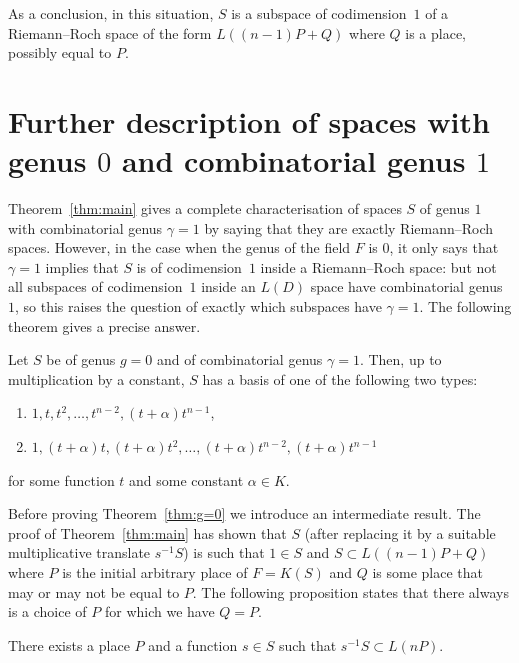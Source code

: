 \documentclass[ALCO,Unicode,ThmDefs]{cedram}
\begin{document}
As a conclusion, in this situation, $S$ is a subspace of codimension~$1$ of a Riemann--Roch space of the form $L((n-1)P+Q)$ where $Q$ is a place, possibly equal to $P$.


\section{Further description of spaces with genus \texorpdfstring{$0$}{0} and combinatorial genus \texorpdfstring{$1$}{1}}\label{sec:genus0}

Theorem~\ref{thm:main} gives a complete characterisation of spaces $S$ of genus $1$ with combinatorial genus $\gamma=1$ by saying that they are exactly Riemann--Roch spaces. However, in the case when the genus of the field $F$ is $0$, it only says that $\gamma=1$ implies that $S$ is of codimension~$1$ inside a Riemann--Roch space: but not all subspaces of codimension~$1$ inside an $L(D)$ space have combinatorial genus $1$, so this raises the question of exactly which subspaces have $\gamma=1$. The following theorem gives a precise answer.

\begin{theo}\label{thm:g=0}
Let $S$ be of genus $g=0$ and of combinatorial genus $\gamma=1$. Then, up to multiplication by a constant, $S$ has a basis of one of the following two types:
\begin{enumerate}
\item $1,t,t^2,\ldots,t^{n-2},(t+\alpha)t^{n-1}$,
\item $1,(t+\alpha)t,(t+\alpha)t^2,\ldots, (t+\alpha)t^{n-2}, (t+\alpha)t^{n-1}$
\end{enumerate}
for some function $t$ and some constant $\alpha\in K$.
\end{theo}

Before proving Theorem~\ref{thm:g=0} we introduce an intermediate result. The proof of Theorem~\ref{thm:main} has shown that $S$ (after replacing it by a suitable multiplicative translate $s^{-1}S$) is such that $1\in S$ and $S\subset L((n-1)P+Q)$ where $P$ is the initial arbitrary place of $F=K(S)$ and $Q$ is some place that may or may not be equal to $P$. The following proposition states that there always is a choice of $P$ for which we have $Q=P$.

\begin{prop}\label{prop:goodP}
There exists a place $P$ and a function $s\in S$ such that $s^{-1}S\subset L(nP)$.
\end{prop}
\end{document}

